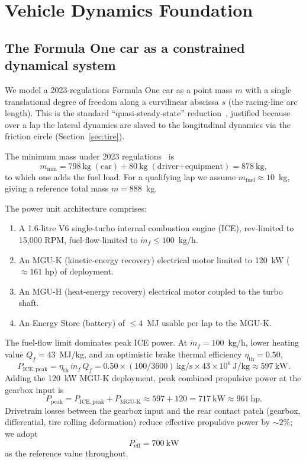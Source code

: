 \documentclass[11pt,twocolumn]{article}
\theoremstyle{definition}
\theoremstyle{remark}
\begin{document}
\section{Vehicle Dynamics Foundation}
\label{sec:dynamics}

\subsection{The Formula One car as a constrained dynamical system}

We model a 2023-regulations Formula One car as a point mass
$m$ with a single translational degree of freedom along a curvilinear abscissa
$s$ (the racing-line arc length). This is the standard ``quasi-steady-state''
reduction~\cite{milliken1995,gillespie1992,genta1997,guiggiani2018,rajamani2012,blundell2004},
justified because over a lap the lateral dynamics are slaved to the
longitudinal dynamics via the friction circle (Section~\ref{sec:tire}).

The minimum mass under 2023 regulations~\cite{fia2023tech,fia2023sport} is
\[
  m_{\mathrm{min}} = 798~\mathrm{kg}\;(\text{car}) + 80~\mathrm{kg}\;(\text{driver+equipment}) = 878~\mathrm{kg},
\]
to which one adds the fuel load. For a qualifying lap we assume
$m_{\mathrm{fuel}} \approx 10$~kg, giving a reference total mass
$m = 888$~kg.

The power unit architecture comprises:
\begin{enumerate}[leftmargin=1.5em]
  \item A 1.6-litre V6 single-turbo internal combustion engine (ICE), rev-limited
        to 15{,}000 RPM, fuel-flow-limited to $\dot m_f \le 100$~kg/h.
  \item An MGU-K (kinetic-energy recovery) electrical motor limited to
        120~kW ($\approx 161$ hp) of deployment.
  \item An MGU-H (heat-energy recovery) electrical motor coupled to the turbo
        shaft.
  \item An Energy Store (battery) of $\le 4$~MJ usable per lap to the MGU-K.
\end{enumerate}
The fuel-flow limit dominates peak ICE power. At $\dot m_f = 100$~kg/h,
lower heating value $Q_f = 43$~MJ/kg, and an optimistic
brake thermal efficiency $\eta_{\mathrm{th}} = 0.50$,
\[
  P_{\mathrm{ICE,peak}} = \eta_{\mathrm{th}}\,\dot m_f\, Q_f
  = 0.50 \times (100/3600)~\mathrm{kg/s} \times 43 \times 10^6~\mathrm{J/kg}
  \approx 597~\mathrm{kW}.
\]
Adding the 120~kW MGU-K deployment, peak combined propulsive power at the
gearbox input is
\[
  P_{\mathrm{peak}} = P_{\mathrm{ICE,peak}} + P_{\mathrm{MGU\text{-}K}}
  \approx 597 + 120 = 717~\mathrm{kW} \approx 961~\mathrm{hp}.
\]
Drivetrain losses between the gearbox input and the rear contact patch
(gearbox, differential, tire rolling deformation) reduce effective propulsive
power by $\sim 2\%$; we adopt
\begin{equation}
  P_{\mathrm{eff}} = 700~\mathrm{kW}
  \label{eq:Peff}
\end{equation}
as the reference value throughout.
\end{document}
